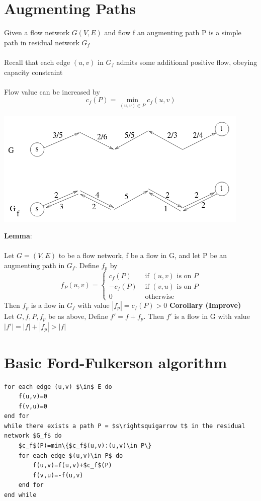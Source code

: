 \documentclass{article}[18pt]
\begin{document}
\section{Augmenting Paths}
Given a flow network $G(V,E)$ and flow f an augmenting path P is a simple path in residual network $G_f$\\
\\
Recall that each edge $(u,v)$ in $G_f$ admits some additional positive flow, obeying capacity constraint\\
\\
Flow value can be increased by
\[
c_{f}(P)=\min _{(u, v) \in P} c_{f}(u, v)
\]
\begin{center}
	\includegraphics[scale=0.7]{"Augmenting Path"}
\end{center}
\textbf{Lemma}:\\
\\
Let $G=(V,E)$ to be a flow network, f be a flow in G, and let P be an augmenting path in $G_f$. Define $f_p$ by
\[
f_{P}(u, v)=\left\{\begin{array}{ll}
{c_{f}(P)} & {\text { if }(u, v) \text { is on } P} \\
{-c_{f}(P)} & {\text { if }(v, u) \text { is on } P} \\
{0} & {\text { otherwise }}
\end{array}\right.
\]
Then $f_p$ is a flow in $G_f$ with value $|f_p|=c_f(P)>0$
\textbf{Corollary (Improve)}\\
Let $G,f,P,f_p$ be as above, Define $f'=f+f_p$. Then $f'$ is a flow in G with value $|f'|=|f|+|f_p|>|f|$
\section{Basic Ford-Fulkerson algorithm}
\begin{lstlisting}[caption=Ford-Fulkerson({G,s,t})]
for each edge (u,v) $\in$ E do
	f(u,v)=0
	f(v,u)=0
end for
while there exists a path P = $s\rightsquigarrow t$ in the residual network $G_f$ do
	$c_f$(P)=min\{$c_f$(u,v):(u,v)\in P\}
	for each edge $(u,v)\in P$ do
		f(u,v)=f(u,v)+$c_f$(P)
		f(v,u)=-f(u,v)
	end for
end while
\end{lstlisting}
\end{document}
